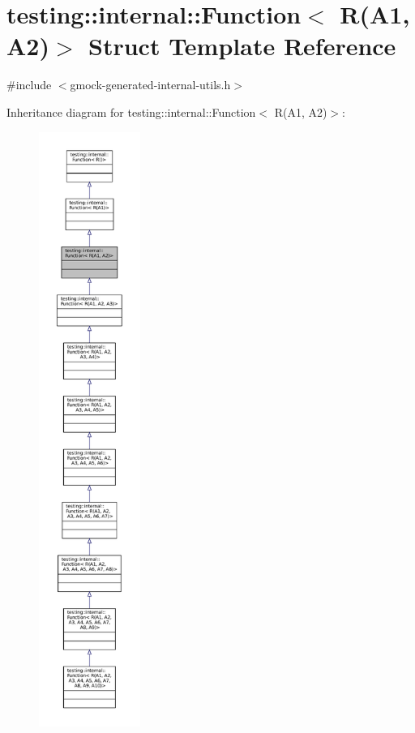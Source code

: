 \hypertarget{structtesting_1_1internal_1_1Function_3_01R_07A1_00_01A2_08_4}{}\section{testing\+:\+:internal\+:\+:Function$<$ R(A1, A2)$>$ Struct Template Reference}
\label{structtesting_1_1internal_1_1Function_3_01R_07A1_00_01A2_08_4}


{\ttfamily \#include $<$gmock-\/generated-\/internal-\/utils.\+h$>$}



Inheritance diagram for testing\+:\+:internal\+:\+:Function$<$ R(A1, A2)$>$\+:
\nopagebreak
\begin{figure}[H]
\begin{center}
\leavevmode
\includegraphics[height=550pt]{structtesting_1_1internal_1_1Function_3_01R_07A1_00_01A2_08_4__inherit__graph}
\end{center}
\end{figure}



